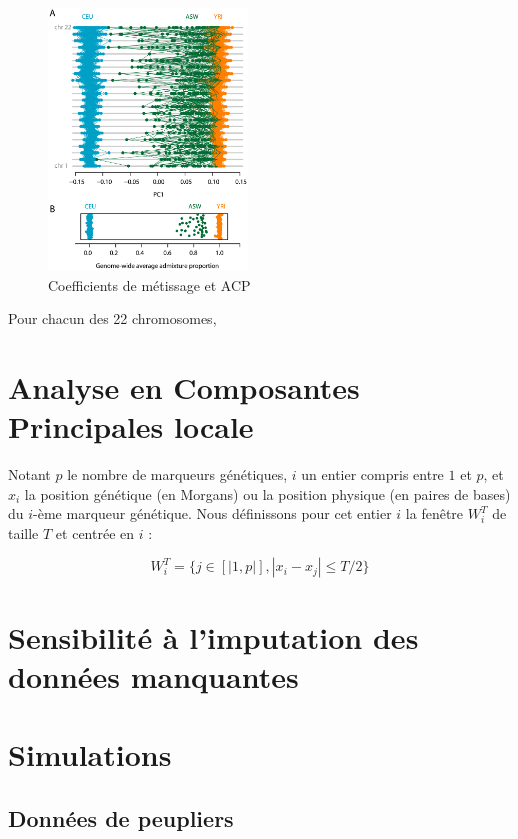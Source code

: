 \documentclass[12pt,twoside]{reedthesis}
\theoremstyle{definition}
\theoremstyle{definition}
\theoremstyle{remark}
\begin{document}
  \begin{figure}
  
  {\centering \includegraphics[width=200px]{figure/mcvean} 
  
  }
  
  \caption{Coefficients de métissage et ACP}\label{fig:mcvean}
  \end{figure}
  
  Pour chacun des 22 chromosomes,
  
  \section{Analyse en Composantes Principales
  locale}\label{analyse-en-composantes-principales-locale}
  
  Notant \(p\) le nombre de marqueurs génétiques, \(i\) un entier compris
  entre \(1\) et \(p\), et \(x_i\) la position génétique (en Morgans) ou
  la position physique (en paires de bases) du \(i\)-ème marqueur
  génétique. Nous définissons pour cet entier \(i\) la fenêtre \(W_i^T\)
  de taille \(T\) et centrée en \(i\) :
  
  \[W_i^T = \{ j \in [|1, p|], |x_i - x_j| \leq T/2 \}\]
  
  \section{Sensibilité à l'imputation des données
  manquantes}\label{sensibilite-a-limputation-des-donnees-manquantes}
  
  \section{Simulations}\label{simulations}
  
  \subsection{Données de peupliers}\label{donnees-de-peupliers}
  
\end{document}
